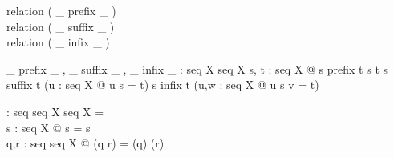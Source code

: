 
\begin{zed}
  relation ( \_ prefix \_ )\\
  relation ( \_ suffix \_ )\\
  relation ( \_ infix \_ )
\end{zed}

\begin{gendef}[X]
  \_ prefix \_ ,  \_ suffix \_ , \_ infix \_ : seq X \rel seq X
\where
  \forall s, t : seq X @
     s prefix t \iff s \subseteq t \land
     s suffix t \iff (\exists u : seq X @ u \cat s = t) \land
     s infix t \iff (\exists u,w : seq X @ u \cat s \cat v = t)
\end{gendef}

\begin{gendef}[X]
  \dcat : seq seq X \fun seq X
\where
  \dcat \langle \rangle = \langle \rangle\\
  \forall s : seq X @ \dcat \langle s \rangle = s\\
  \forall q,r : seq seq X @ \dcat(q \cat r) = (\dcat q) \cat (\dcat r)
\end{gendef}
